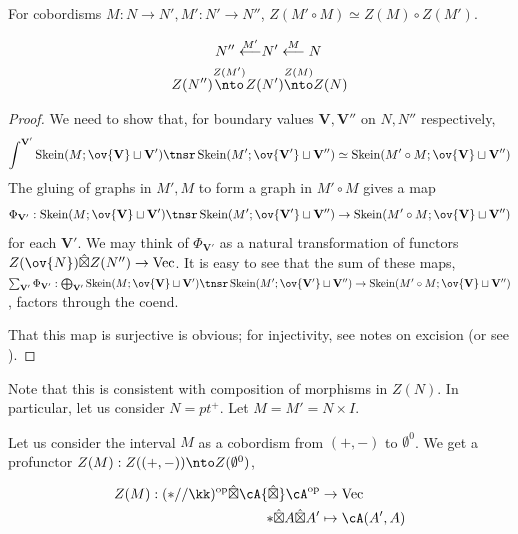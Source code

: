 \documentclass[12pt]{article}
\newcommand{\empt}[1]{{\emptyset^{#1}}}
\newcommand{\VV}{{\mathbf{V}}}
\DeclareMathOperator{\Skein}{Skein}
\newcommand{\op}{{\text{op}}}
\newcommand{\hatbox}{{\hat{\boxtimes}}}
\DeclareMathOperator{\Vect}{Vec}
\begin{document}
\begin{proposition}
\label{p:1-cobord-compose}
For cobordisms $M: N \to N', M': N' \to N''$,
$Z(M' \circ M) \simeq Z(M) \circ Z(M')$.

\begin{align*}
N'' \overset{M'}{\longleftarrow}
& N' \overset{M}{\longleftarrow}
N
\\
Z(N'') \overset{Z(M')}{\nto}
Z(& N') \overset{Z(M)}{\nto}
Z(N)
\end{align*}
\end{proposition}

\begin{proof}
We need to show that, for boundary values
$\VV,\VV''$ on $N,N''$ respectively,
\[
\int^{\VV'}
\Skein(M; \ov{\VV} \sqcup \VV')
\tnsr
\Skein(M';\ov{\VV'} \sqcup \VV'')
\simeq \Skein(M' \circ M; \ov{\VV} \sqcup \VV'')
\]
The gluing of graphs in $M',M$ to form a graph in
$M' \circ M$ gives a map
\[
\Phi_{\VV'}:
\Skein(M; \ov{\VV} \sqcup \VV')
\tnsr
\Skein(M';\ov{\VV'} \sqcup \VV'')
\to \Skein(M' \circ M; \ov{\VV} \sqcup \VV'')
\]
for each $\VV'$.
We may think of $\Phi_{\VV'}$
as a natural transformation of functors
$Z(\ov{N}) \hatbox Z(N'') \to \Vect$.
It is easy to see that the sum of these maps,
$\sum_{\VV'} \Phi_{\VV'}:
\bigoplus_{\VV'}
\Skein(M; \ov{\VV} \sqcup \VV')
\tnsr
\Skein(M';\ov{\VV'} \sqcup \VV'')
\to \Skein(M' \circ M; \ov{\VV} \sqcup \VV'')$,
factors through the coend.

That this map is surjective is obvious;
for injectivity, see notes on excision
(or see \cite{KT}).
\end{proof}


Note that this is consistent with
composition of morphisms in $Z(N)$.
In particular, let us consider $N = pt^+$.
Let $M = M' = N \times I$.




\begin{example}
Let us consider the interval $M$
as a cobordism from $(+,-)$ to $\empt{0}$.
We get a profunctor
$Z(M) : Z((+,-)) \nto Z(\empt{0})$,

\begin{align*}
Z(M) : (*//\kk)^\op \hatbox \cA \hatbox \cA^\op &\to \Vect
\\
* \hatbox A \hatbox A' &\mapsto \cA(A',A)
\end{align*}
\end{example}



%
%
%
\end{document}
